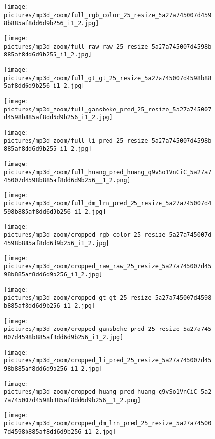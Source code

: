 \documentclass[final]{cvpr}
\begin{document}
    \begin{figure*}[h]
    \setlength{\columnsep}{2pt}
    \setlength\multicolsep{0pt}
        \begin{multicols}{7}
        \texttt{[image: pictures/mp3d\_zoom/full\_rgb\_color\_25\_resize\_5a27a745007d4598b885af8dd6d9b256\_i1\_2.jpg]}\par
        \texttt{[image: pictures/mp3d\_zoom/full\_raw\_raw\_25\_resize\_5a27a745007d4598b885af8dd6d9b256\_i1\_2.jpg]}\par
        \texttt{[image: pictures/mp3d\_zoom/full\_gt\_gt\_25\_resize\_5a27a745007d4598b885af8dd6d9b256\_i1\_2.jpg]}\par 
        \texttt{[image: pictures/mp3d\_zoom/full\_gansbeke\_pred\_25\_resize\_5a27a745007d4598b885af8dd6d9b256\_i1\_2.jpg]}\par 
        \texttt{[image: pictures/mp3d\_zoom/full\_li\_pred\_25\_resize\_5a27a745007d4598b885af8dd6d9b256\_i1\_2.jpg]}\par
        \texttt{[image: pictures/mp3d\_zoom/full\_huang\_pred\_huang\_q9vSo1VnCiC\_5a27a745007d4598b885af8dd6d9b256\_\_1\_2.png]}\par 
        \texttt{[image: pictures/mp3d\_zoom/full\_dm\_lrn\_pred\_25\_resize\_5a27a745007d4598b885af8dd6d9b256\_i1\_2.jpg]}\par 
        \end{multicols}
        
        \begin{multicols}{7}
        \texttt{[image: pictures/mp3d\_zoom/cropped\_rgb\_color\_25\_resize\_5a27a745007d4598b885af8dd6d9b256\_i1\_2.jpg]}\par
        \texttt{[image: pictures/mp3d\_zoom/cropped\_raw\_raw\_25\_resize\_5a27a745007d4598b885af8dd6d9b256\_i1\_2.jpg]}\par
        \texttt{[image: pictures/mp3d\_zoom/cropped\_gt\_gt\_25\_resize\_5a27a745007d4598b885af8dd6d9b256\_i1\_2.jpg]}\par 
        \texttt{[image: pictures/mp3d\_zoom/cropped\_gansbeke\_pred\_25\_resize\_5a27a745007d4598b885af8dd6d9b256\_i1\_2.jpg]}\par 
        \texttt{[image: pictures/mp3d\_zoom/cropped\_li\_pred\_25\_resize\_5a27a745007d4598b885af8dd6d9b256\_i1\_2.jpg]}\par
        \texttt{[image: pictures/mp3d\_zoom/cropped\_huang\_pred\_huang\_q9vSo1VnCiC\_5a27a745007d4598b885af8dd6d9b256\_\_1\_2.png]}\par 
        \texttt{[image: pictures/mp3d\_zoom/cropped\_dm\_lrn\_pred\_25\_resize\_5a27a745007d4598b885af8dd6d9b256\_i1\_2.jpg]}\par 
        \end{multicols}


\end{figure*}
\end{document}
